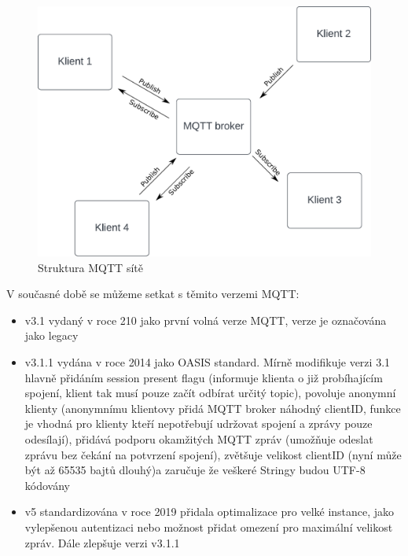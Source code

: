     \begin{figure}[!h]
      \begin{center}
        \includegraphics[scale=0.5]{obrazky/prace/MQTT.pdf}
      \end{center}
      \caption[Struktura MQTT sítě]{Struktura MQTT sítě}
      \label{obr:MQTT}
    \end{figure}
    
\par V současné době se můžeme setkat s těmito verzemi MQTT:
    \begin{itemize}
        \item v3.1 vydaný v roce 210 jako první volná verze MQTT, verze je označována jako legacy \cite{lrDVyaBRVfGzwzsO}
        \item v3.1.1 vydána v roce 2014 jako OASIS standard. Mírně modifikuje verzi 3.1 hlavně přidáním session present flagu (informuje klienta o již probíhajícím spojení, klient tak musí pouze začít odbírat určitý topic), povoluje anonymní klienty (anonymnímu klientovy přidá MQTT broker náhodný clientID, funkce je vhodná pro klienty kteří nepotřebují udržovat spojení a zprávy pouze odesílají), přidává podporu okamžitých MQTT zpráv (umožňuje odeslat zprávu bez čekání na potvrzení spojení), zvětšuje velikost clientID (nyní může být až 65535 bajtů dlouhý)a zaručuje že veškeré Stringy budou UTF-8 kódovány \cite{Banks2014}
        \item v5 standardizována v roce 2019 přidala optimalizace pro velké instance, jako vylepšenou autentizaci nebo možnost přidat omezení pro maximální velikost zpráv. Dále zlepšuje verzi v3.1.1 \cite{Liadovc20092022}
    \end{itemize}

